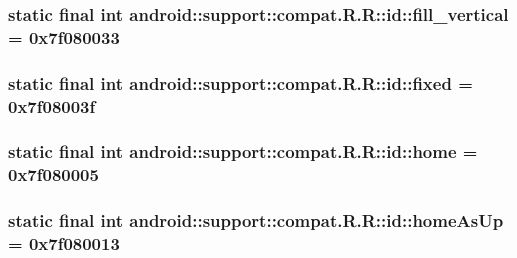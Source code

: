 \hypertarget{classandroid_1_1support_1_1compat_1_1_r_1_1id_75bcb765eea13bb32d6a807da57d366f}{
\subsubsection[{fill\_\-vertical}]{\setlength{\rightskip}{0pt plus 5cm}static final int android::support::compat.R.R::id::fill\_\-vertical = 0x7f080033}}
\label{classandroid_1_1support_1_1compat_1_1_r_1_1id_75bcb765eea13bb32d6a807da57d366f}


\hypertarget{classandroid_1_1support_1_1compat_1_1_r_1_1id_deee367919f93e5e003ada41377eeb4d}{
\subsubsection[{fixed}]{\setlength{\rightskip}{0pt plus 5cm}static final int android::support::compat.R.R::id::fixed = 0x7f08003f}}
\label{classandroid_1_1support_1_1compat_1_1_r_1_1id_deee367919f93e5e003ada41377eeb4d}


\hypertarget{classandroid_1_1support_1_1compat_1_1_r_1_1id_8842ff02610b8e53595aae3d4ec4bdd4}{
\subsubsection[{home}]{\setlength{\rightskip}{0pt plus 5cm}static final int android::support::compat.R.R::id::home = 0x7f080005}}
\label{classandroid_1_1support_1_1compat_1_1_r_1_1id_8842ff02610b8e53595aae3d4ec4bdd4}


\hypertarget{classandroid_1_1support_1_1compat_1_1_r_1_1id_024c3e5134a6837efb0fd2ac046b7f65}{
\subsubsection[{homeAsUp}]{\setlength{\rightskip}{0pt plus 5cm}static final int android::support::compat.R.R::id::homeAsUp = 0x7f080013}}
\label{classandroid_1_1support_1_1compat_1_1_r_1_1id_024c3e5134a6837efb0fd2ac046b7f65}


